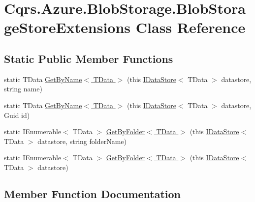 \hypertarget{classCqrs_1_1Azure_1_1BlobStorage_1_1BlobStorageStoreExtensions}{}\section{Cqrs.\+Azure.\+Blob\+Storage.\+Blob\+Storage\+Store\+Extensions Class Reference}
\label{classCqrs_1_1Azure_1_1BlobStorage_1_1BlobStorageStoreExtensions}
\subsection*{Static Public Member Functions}
\begin{DoxyCompactItemize}
\item 
static T\+Data \hyperlink{classCqrs_1_1Azure_1_1BlobStorage_1_1BlobStorageStoreExtensions_a05556de9a118a0be43dd328b29591d2d_a05556de9a118a0be43dd328b29591d2d}{Get\+By\+Name$<$ T\+Data $>$} (this \hyperlink{interfaceCqrs_1_1DataStores_1_1IDataStore}{I\+Data\+Store}$<$ T\+Data $>$ datastore, string name)
\item 
static T\+Data \hyperlink{classCqrs_1_1Azure_1_1BlobStorage_1_1BlobStorageStoreExtensions_a21e2becce47e62b14f2b6ef659ac646b_a21e2becce47e62b14f2b6ef659ac646b}{Get\+By\+Name$<$ T\+Data $>$} (this \hyperlink{interfaceCqrs_1_1DataStores_1_1IDataStore}{I\+Data\+Store}$<$ T\+Data $>$ datastore, Guid id)
\item 
static I\+Enumerable$<$ T\+Data $>$ \hyperlink{classCqrs_1_1Azure_1_1BlobStorage_1_1BlobStorageStoreExtensions_a68980261b5e1806826f23e38fcb9a838_a68980261b5e1806826f23e38fcb9a838}{Get\+By\+Folder$<$ T\+Data $>$} (this \hyperlink{interfaceCqrs_1_1DataStores_1_1IDataStore}{I\+Data\+Store}$<$ T\+Data $>$ datastore, string folder\+Name)
\item 
static I\+Enumerable$<$ T\+Data $>$ \hyperlink{classCqrs_1_1Azure_1_1BlobStorage_1_1BlobStorageStoreExtensions_a71348a56844b38342f7d9e6d979fa3f6_a71348a56844b38342f7d9e6d979fa3f6}{Get\+By\+Folder$<$ T\+Data $>$} (this \hyperlink{interfaceCqrs_1_1DataStores_1_1IDataStore}{I\+Data\+Store}$<$ T\+Data $>$ datastore)
\end{DoxyCompactItemize}


\subsection{Member Function Documentation}
\mbox{\label{classCqrs_1_1Azure_1_1BlobStorage_1_1BlobStorageStoreExtensions_a68980261b5e1806826f23e38fcb9a838_a68980261b5e1806826f23e38fcb9a838}} 
